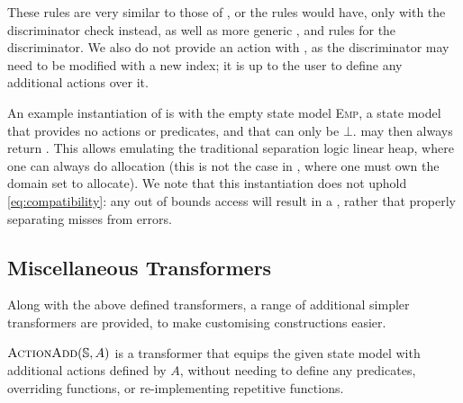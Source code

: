 
These rules are very similar to those of \PMap, or the rules \List{} would have, only with the discriminator check instead, as well as more generic \consume, \produce{} and \fix{} rules for the discriminator. We also do not provide an \alloc{} action with \GMap, as the discriminator may need to be modified with a new index; it is up to the user to define any additional actions over it.

An example instantiation of \GMap{} is with the empty state model \textsc{Emp}, a state model that provides no actions or predicates, and that can only be $\bot$.  may then always return \vtrue. This allows emulating the traditional separation logic linear heap, where one can always do allocation (this is not the case in \PMap{}, where one must own the domain set to allocate). We note that this instantiation does not uphold \ref{eq:compatibility}: any out of bounds access will result in a \Miss{}, rather that properly separating misses from errors.

\subsection{Miscellaneous Transformers}


Along with the above defined transformers, a range of additional simpler transformers are provided, to make customising constructions easier.

$\textsc{ActionAdd}(\mathbb S, A)$ is a transformer that equips the given state model with additional actions defined by $A$, without needing to define any predicates, overriding functions, or re-implementing repetitive functions.

